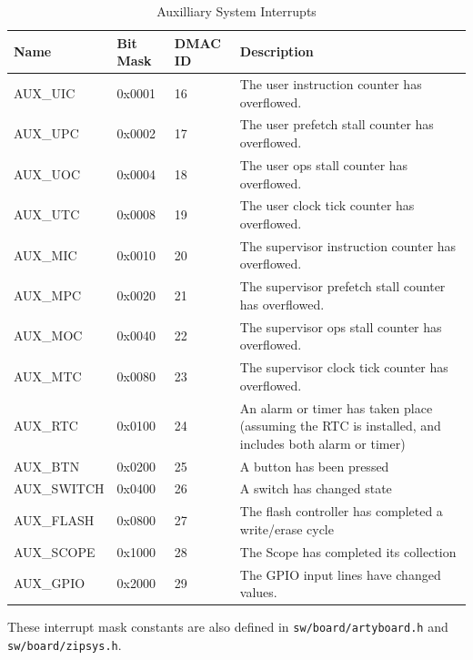 \documentclass{gqtekspec}
\begin{document}
\begin{table}[htbp]
\begin{center}\begin{tabular}{|p{0.9in}|p{0.75in}|p{0.75in}|p{3.00in}|}\hline
\rowcolor[gray]{0.85} Name & Bit Mask & DMAC ID &Description \\\hline\hline
AUX\_UIC & 0x0001 & 16 & The user instruction counter has overflowed.\\\hline
AUX\_UPC & 0x0002 & 17 & The user prefetch stall counter has overflowed.\\\hline
AUX\_UOC & 0x0004 & 18 & The user ops stall counter has overflowed.\\\hline
AUX\_UTC & 0x0008 & 19 & The user clock tick counter has overflowed.\\\hline
AUX\_MIC & 0x0010 & 20 & The supervisor instruction counter has overflowed.\\\hline
AUX\_MPC & 0x0020 & 21 & The supervisor prefetch stall counter has overflowed.\\\hline
AUX\_MOC & 0x0040 & 22 & The supervisor ops stall counter has overflowed.\\\hline
AUX\_MTC & 0x0080 & 23 & The supervisor clock tick counter has overflowed.\\\hline
AUX\_RTC    & 0x0100 & 24& An alarm or timer has taken place (assuming the RTC
		is installed, and includes both alarm or timer)\\\hline
AUX\_BTN    & 0x0200 & 25 & A button has been pressed\\\hline
AUX\_SWITCH & 0x0400 & 26 & A switch has changed state\\\hline
AUX\_FLASH  & 0x0800 & 27 & The flash controller has completed a write/erase cycle\\\hline
AUX\_SCOPE  & 0x1000 & 28 & The Scope has completed its collection\\\hline
AUX\_GPIO   & 0x2000 & 29 & The GPIO input lines have changed values.\\\hline
\end{tabular}
\caption{Auxilliary System Interrupts}\label{tbl:aux-ints}
\end{center}\end{table}
These interrupt mask constants are also defined in {\tt sw/board/artyboard.h}
and {\tt sw/board/zipsys.h}.
\end{document}
